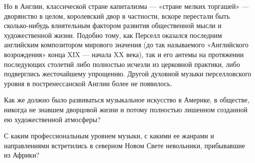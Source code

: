 Но  в  Англии,  классической  стране капитализма  ---  «стране  мелких
торгашей»  ---  дворянство  в  целом, королевский  двор  в  частности,
вскоре  перестали быть  сколько-нибудь  влиятельным фактором  развития
общественной мысли  и художественной жизни. Подобно  тому, как Перселл
оказался  последним  английским  композитором  мирового  значения  (до
так  называемого  «Английского  возрождения»   конца  XIX  ---  начала
XX  века),  так  и  его  антемы  на  протяжении  последующих  столетий
либо  полностью  исчезли  из   церковной  практики,  либо  подверглись
жесточайшему упрощению. Другой духовной музыки перселловского уровня в
постренессанской Англии более не появилось.

Как  же должно  было развиваться  музыкальное искусство  в Америке,  в
обществе,  никогда  не  знавшем  дворцовой жизни  и  потому  полностью
лишенном созданной ею художественной атмосферы?

С  каким   профессиональным  уровнем  музыки,  с   какими  ее  жанрами
и  направлениями  встретились  в   северном  Новом  Свете  невольники,
прибывавшие из Африки?
